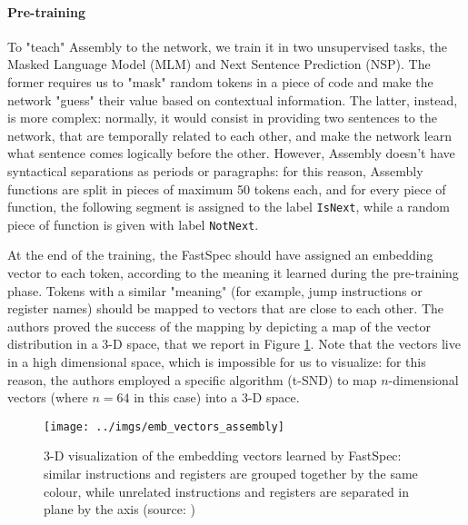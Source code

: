 \documentclass[12pt,a4paper]{book}
\theoremstyle{definition}
\begin{document}
	\paragraph{Pre-training} To "teach" Assembly to the network, we train it in two unsupervised tasks, the Masked Language Model (MLM) and Next Sentence Prediction (NSP). The former requires us to "mask" random tokens in a piece of code and make the network "guess" their value based on contextual information. The latter, instead, is more complex: normally, it would consist in providing two sentences to the network, that are temporally related to each other, and make the network learn what sentence comes logically before the other. However, Assembly doesn't have syntactical separations as periods or paragraphs: for this reason, Assembly functions are split in pieces of maximum 50 tokens each, and for every piece of function, the following segment is assigned to the label \texttt{IsNext}, while a random piece of function is given with label \texttt{NotNext}.
	
	At the end of the training, the FastSpec should have assigned an embedding vector to each token, according to the meaning it learned during the pre-training phase. Tokens with a similar "meaning" (for example, jump instructions or register names) should be mapped to vectors that are close to each other. The authors proved the success of the mapping by depicting a map of the vector distribution in a 3-D space, that we report in Figure \ref{fig:emb_vec}. Note that the vectors live in a high dimensional space, which is impossible for us to visualize: for this reason, the authors employed a specific algorithm (t-SND) to map $n$-dimensional vectors (where $n = 64$ in this case) into a 3-D space.
	
	\begin{figure}
		\centering
		\texttt{[image: ../imgs/emb\_vectors\_assembly]}
		\captionsetup{width=.7\linewidth}
		\caption{3-D visualization of the embedding vectors learned by FastSpec: similar instructions and registers are grouped together by the same colour, while unrelated instructions and registers are separated in plane by the axis (source: \cite{Tol2021})}
		\label{fig:emb_vec}
	\end{figure}
	
\end{document}
